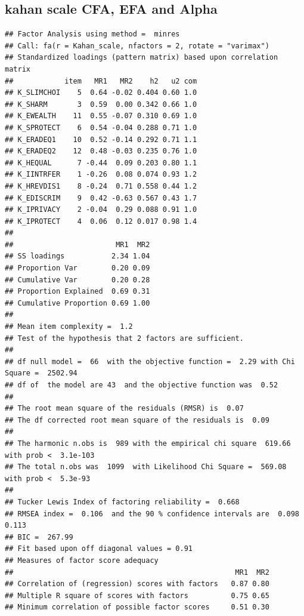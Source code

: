 \documentclass[
]{article}
\begin{document}
\newpage

\hypertarget{kahan-scale-cfa-efa-and-alpha}{%
\subsection{kahan scale CFA, EFA and
Alpha}\label{kahan-scale-cfa-efa-and-alpha}}

\begin{verbatim}
## Factor Analysis using method =  minres
## Call: fa(r = Kahan_scale, nfactors = 2, rotate = "varimax")
## Standardized loadings (pattern matrix) based upon correlation matrix
##            item   MR1   MR2    h2   u2 com
## K_SLIMCHOI    5  0.64 -0.02 0.404 0.60 1.0
## K_SHARM       3  0.59  0.00 0.342 0.66 1.0
## K_EWEALTH    11  0.55 -0.07 0.310 0.69 1.0
## K_SPROTECT    6  0.54 -0.04 0.288 0.71 1.0
## K_ERADEQ1    10  0.52 -0.14 0.292 0.71 1.1
## K_ERADEQ2    12  0.48 -0.03 0.235 0.76 1.0
## K_HEQUAL      7 -0.44  0.09 0.203 0.80 1.1
## K_IINTRFER    1 -0.26  0.08 0.074 0.93 1.2
## K_HREVDIS1    8 -0.24  0.71 0.558 0.44 1.2
## K_EDISCRIM    9  0.42 -0.63 0.567 0.43 1.7
## K_IPRIVACY    2 -0.04  0.29 0.088 0.91 1.0
## K_IPROTECT    4  0.06  0.12 0.017 0.98 1.4
## 
##                        MR1  MR2
## SS loadings           2.34 1.04
## Proportion Var        0.20 0.09
## Cumulative Var        0.20 0.28
## Proportion Explained  0.69 0.31
## Cumulative Proportion 0.69 1.00
## 
## Mean item complexity =  1.2
## Test of the hypothesis that 2 factors are sufficient.
## 
## df null model =  66  with the objective function =  2.29 with Chi Square =  2502.94
## df of  the model are 43  and the objective function was  0.52 
## 
## The root mean square of the residuals (RMSR) is  0.07 
## The df corrected root mean square of the residuals is  0.09 
## 
## The harmonic n.obs is  989 with the empirical chi square  619.66  with prob <  3.1e-103 
## The total n.obs was  1099  with Likelihood Chi Square =  569.08  with prob <  5.3e-93 
## 
## Tucker Lewis Index of factoring reliability =  0.668
## RMSEA index =  0.106  and the 90 % confidence intervals are  0.098 0.113
## BIC =  267.99
## Fit based upon off diagonal values = 0.91
## Measures of factor score adequacy             
##                                                    MR1  MR2
## Correlation of (regression) scores with factors   0.87 0.80
## Multiple R square of scores with factors          0.75 0.65
## Minimum correlation of possible factor scores     0.51 0.30
\end{verbatim}

\newpage
\end{document}
